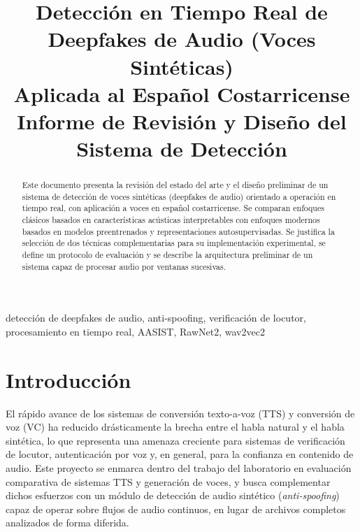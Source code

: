 \documentclass[conference]{IEEEtran}
\begin{document}
\title{Detección en Tiempo Real de Deepfakes de Audio (Voces Sintéticas)\\
Aplicada al Español Costarricense\\
\large Informe de Revisión y Diseño del Sistema de Detección}

\author{
}

\maketitle

\begin{abstract}
Este documento presenta la revisión del estado del arte y el diseño preliminar de un sistema de detección de voces sintéticas (deepfakes de audio) orientado a operación en tiempo real, con aplicación a voces en español costarricense. Se comparan enfoques clásicos basados en características acústicas interpretables con enfoques modernos basados en modelos preentrenados y representaciones autosupervisadas. Se justifica la selección de dos técnicas complementarias para su implementación experimental, se define un protocolo de evaluación y se describe la arquitectura preliminar de un sistema capaz de procesar audio por ventanas sucesivas.
\end{abstract}

\begin{IEEEkeywords}
detección de deepfakes de audio, anti-spoofing, verificación de locutor, procesamiento en tiempo real, AASIST, RawNet2, wav2vec2
\end{IEEEkeywords}

\section{Introducción}

El rápido avance de los sistemas de conversión texto-a-voz (TTS) y conversión de voz (VC) ha reducido drásticamente la brecha entre el habla natural y el habla sintética, lo que representa una amenaza creciente para sistemas de verificación de locutor, autenticación por voz y, en general, para la confianza en contenido de audio. Este proyecto se enmarca dentro del trabajo del laboratorio en evaluación comparativa de sistemas TTS y generación de voces, y busca complementar dichos esfuerzos con un módulo de detección de audio sintético (\emph{anti-spoofing}) capaz de operar sobre flujos de audio continuos, en lugar de archivos completos analizados de forma diferida.
\end{document}

